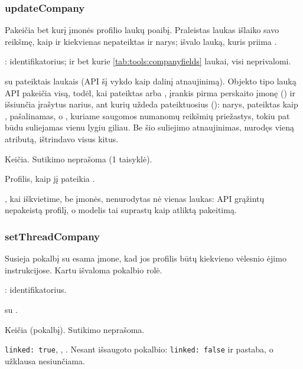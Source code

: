 \subsubsection{updateCompany}\label{sec:tools:updateCompany}
\begin{description}[style=multiline, leftmargin=19mm, labelwidth=17mm, labelsep=2mm,
  font=\sffamily\bfseries\footnotesize\color{ink}, itemsep=1pt, topsep=2pt, before=\raggedright]
  \item[Paskirtis] Pakeičia bet kurį įmonės profilio laukų poaibį. Praleistas laukas išlaiko
    savo reikšmę, kaip ir kiekvienas nepateiktas  ir 
    narys;  išvalo lauką, kuris priima .
  \item[Įvestis] : identifikatorius; ir bet kurie \cref{tab:tools:companyfields}
    laukai, visi neprivalomi.
  \item[Užklausos]  su pateiktais laukais (API šį 
    vykdo kaip dalinį atnaujinimą). Objekto tipo lauką API pakeičia visą, todėl, kai pateiktas
     arba , įrankis pirma perskaito įmonę
    () ir išsiunčia įrašytus narius, ant kurių uždeda
    pateiktuosius (): narys, pateiktas kaip , pašalinamas, o
    , kuriame saugomos numanomų reikšmių priežastys, tokiu pat būdu
    suliejamas vienu lygiu giliau. Be šio suliejimo atnaujinimas, nurodęs vieną atributą,
    ištrindavo visus kitus.
  \item[Pobūdis] Keičia. Sutikimo neprašoma (1 taisyklė).
  \item[Grąžina] Profilis, kaip jį pateikia .
  \item[Klaidos] , kai iškvietime, be įmonės, nenurodytas nė vienas
    laukas: API grąžintų nepakeistą profilį, o modelis tai suprastų kaip atliktą pakeitimą.
\end{description}

\subsubsection{setThreadCompany}\label{sec:tools:setThreadCompany}
\begin{description}[style=multiline, leftmargin=19mm, labelwidth=17mm, labelsep=2mm,
  font=\sffamily\bfseries\footnotesize\color{ink}, itemsep=1pt, topsep=2pt, before=\raggedright]
  \item[Paskirtis] Susieja pokalbį su esama įmone, kad jos profilis būtų kiekvieno vėlesnio
    ėjimo instrukcijose. Kartu išvaloma pokalbio rolė.
  \item[Įvestis] : identifikatorius.
  \item[Užklausos]  su .
  \item[Pobūdis] Keičia (pokalbį). Sutikimo neprašoma.
  \item[Grąžina] \texttt{linked: true}, , . Nesant išsaugoto
    pokalbio: \texttt{linked: false} ir pastaba, o užklausa nesiunčiama.
\end{description}


